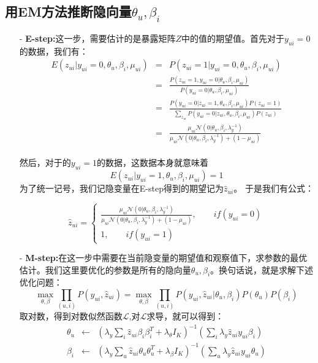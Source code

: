 \documentclass[notitlepage,cs4size,punct,oneside]{ctexrep}
\numberwithin{equation}{chapter}
\theoremstyle{mystyle}
\begin{document}
\subsection{用EM方法推断隐向量$\theta_u,\beta_i$}
\begin{itemize}
\item[-] \textbf{E-step:}这一步，需要估计的是暴露矩阵$Z$中的值的期望值。首先对于$y_{ui}=0$的数据，我们有：
	\begin{eqnarray*}
	E(z_{ui}|y_{ui}=0,\theta_u,\beta_i,\mu_{ui})&=& P(z_{ui}=1|y_{ui}=0,\theta_u,\beta_i,\mu_{ui})\\
	&=& \frac{P(z_{ui}=1,y_{ui}=0|\theta_u,\beta_i,\mu_{ui})}{P(y_{ui}=0|\theta_u,\beta_i,\mu_{ui})}\\
	&=& \frac{P(y_{ui}=0|z_{ui}=1,\theta_u,\beta_i,\mu_{ui})P(z_{ui}=1)}{\sum_{z_{ui}}P(y_{ui}=0|z_{ui},\theta_u,\beta_i,\mu_{ui})P(z_{ui})}\\
	&=& \frac{\mu_{ui}\mathcal{N}(0|\theta_u,\beta_i,\lambda_y^{-1})}{\mu_{ui}\mathcal{N}(0|\theta_u,\beta_i,\lambda_y^{-1})+(1-\mu_{ui})}
	\end{eqnarray*}\\
	然后，对于的$y_{ui}=1$的数据，这数据本身就意味着$$E(z_{ui}|y_{ui}=1,\theta_u,\beta_i,\mu_{ui})=1$$为了统一记号，我们记隐变量在E-step得到的期望记为$\hat{z}_{ui}$。
	于是我们有公式：

	\begin{equation}\label{updateZ}
	\hat{z}_{ui}=\left\{
	\begin{aligned}
	\frac{\mu_{ui}\mathcal{N}(0|\theta_u,\beta_i,\lambda_y^{-1})}{\mu_{ui}\mathcal{N}(0|\theta_u,\beta_i,\lambda_y^{-1})+(1-\mu_{ui})}, \qquad if (y_{ui}=0) \\
	1, \qquad if (y_{ui}=1)
	\end{aligned}
	\right.
	\end{equation}

\item[-] \textbf{M-step:}在这一步中需要在当前隐变量的期望值和观察值下，求参数的最优估计。我们这里要优化的参数是所有的隐向量$\theta_u,\beta_i$。换句话说，就是求解下述优化问题：
	$$\max_{\theta,\beta}\prod_{(u,i)}P(y_{ui},\hat{z}_{ui})=\max_{\theta,\beta}\prod_{(u,i)}P(y_{ui},\hat{z}_{ui}|\theta_u,\beta_i)P(\theta_u)P(\beta_i)$$
	取对数，得到对数似然函数$\mathcal{L}$,对$\mathcal{L}$求导，就可以得到：
	\begin{eqnarray}
	\theta _{ u } &\leftarrow& (\lambda _{ y }\sum _{ i } \hat { z}_{ ui }  \beta _{ i }\beta _{ i }^{ T }+\lambda _{ \theta  }I_{ K })^{ -1 }(\sum _{ i } \lambda _{ y }\hat { z}_{ ui }  y_{ ui }\beta _{ i })\label{updateTheta}\\
	\beta _{ i }  &\leftarrow& (\lambda _{ y }\sum _{ u } \hat { z}_{ ui }  \theta _{ u }\theta _{ u }^{ T }+\lambda _{ \beta  }I_{ K })^{ -1 }(\sum _{ u } \lambda _{ y }\hat { z}_{ ui }  y_{ ui }\theta_{ u })\label{updateBeta}
	\end{eqnarray}
\end{itemize}
\end{document}
